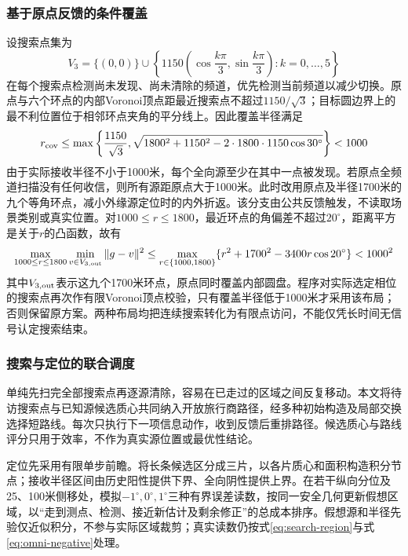 \documentclass{JXUSTmodeling}
\begin{document}
\subsubsection{基于原点反馈的条件覆盖}
设搜索点集为
\begin{equation}
 V_3=\{(0,0)\}\cup\left\{1150
 \left(\cos\frac{k\pi}{3},\sin\frac{k\pi}{3}\right):k=0,\ldots,5\right\}
 \label{eq:p3-points}
\end{equation}
在每个搜索点检测尚未发现、尚未清除的频道，优先检测当前频道以减少切换。原点与六个环点的内部Voronoi顶点距最近搜索点不超过$1150/\sqrt3$；目标圆边界上的最不利位置位于相邻环点夹角的平分线上。因此覆盖半径满足
\begin{equation}
 r_{\rm cov}\le\max\left\{\frac{1150}{\sqrt3},
 \sqrt{1800^2+1150^2-2\cdot1800\cdot1150\cos30^\circ}\right\}<1000
 \label{eq:p3-cover}
\end{equation}
由于实际接收半径不小于1000米，每个全向源至少在其中一点被发现。若原点全频道扫描没有任何收信，则所有源距原点大于1000米。此时改用原点及半径1700米的九个等角环点，减小外缘源定位时的内外折返。该分支由公共反馈触发，不读取场景类别或真实位置。对$1000\le r\le1800$，最近环点的角偏差不超过$20^\circ$，距离平方是关于$r$的凸函数，故有
\begin{equation}
 \max_{1000\le r\le1800}\min_{v\in V_{3,\rm out}}\|g-v\|^2
 \le\max_{r\in\{1000,1800\}}\{r^2+1700^2-3400r\cos20^\circ\}<1000^2
 \label{eq:p3-annular}
\end{equation}
其中$V_{3,\rm out}$表示这九个1700米环点，原点同时覆盖内部圆盘。程序对实际选定相位的搜索点再次作有限Voronoi顶点校验，只有覆盖半径低于1000米才采用该布局；否则保留原方案。两种布局均把连续搜索转化为有限点访问，不能仅凭长时间无信号认定搜索结束。

\subsubsection{搜索与定位的联合调度}
单纯先扫完全部搜索点再逐源清除，容易在已走过的区域之间反复移动。本文将待访搜索点与已知源候选质心共同纳入开放旅行商路径，经多种初始构造及局部交换选择短路线。每次只执行下一项信息动作，收到反馈后重排路径。候选质心与路线评分只用于效率，不作为真实源位置或最优性结论。

定位先采用有限单步前瞻。将长条候选区分成三片，以各片质心和面积构造积分节点；接收半径区间由历史阳性提供下界、全向阴性提供上界。在若干纵向分位及25、100米侧移处，模拟$-1^\circ,0^\circ,1^\circ$三种有界误差读数，按同一安全几何更新假想区域，以“走到测点、检测、接近新估计及剩余修正”的总成本排序。假想源和半径先验仅近似积分，不参与实际区域裁剪；真实读数仍按式\eqref{eq:search-region}与式\eqref{eq:omni-negative}处理。
\end{document}
